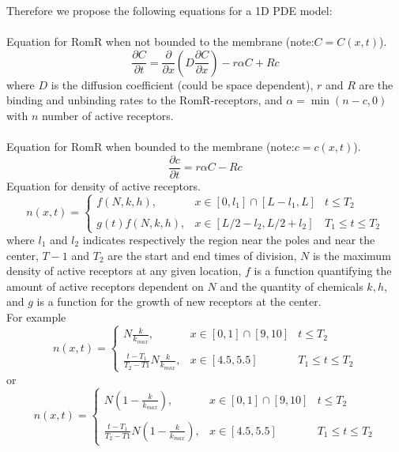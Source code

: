 \documentclass[12pt]{article}
\begin{document}
Therefore we propose the following equations for a 1D PDE model:\\ \\
Equation for RomR when not bounded to the membrane (note:$C=C(x,t)$).
\begin{equation}
\frac{\partial C}{\partial t}=\frac{\partial}{\partial x}\left(D\frac{\partial C}{\partial x}\right)- r\alpha C+R c
\end{equation}
where $D$ is the diffusion coefficient (could be space dependent), $r$ and $R$ are the binding  and unbinding rates to the RomR-receptors, and $\alpha=\min(n-c,0)$ with $n$ number of active receptors.\\ \\
Equation for RomR when bounded to the membrane (note:$c=c(x,t)$).
\begin{equation}
\frac{\partial c}{\partial t}=r\alpha C-R c 
\end{equation}
Equation for density of active receptors.
\begin{equation}
   n(x,t) = \left\{
     \begin{array}{lcr}
       f (N, k, h),& x\in [0, l_1]\cap [L-l_1, L] & t \leq T_2\\
       & &\\
 g(t)f (N, k, h) ,& x \in[L/2-l_2, L/2 +l_2 ] & T_1\leq t \leq T_2

     \end{array}
   \right.
\end{equation}
where $l_1$ and $l_2$ indicates respectively the region near the poles and near the center, $T-1$ and $T_2$ are the start and end times of division,  $N$ is the maximum density of active receptors at any given location, $f$ is a function quantifying the amount of active receptors dependent on $N$ and the quantity of chemicals $k, h$, and $g$ is a function for the growth of new receptors at the center.\\
For example
\begin{equation}
   n(x,t) = \left\{
     \begin{array}{lcr}
       N \frac{k}{k_{max}},& x\in [0, 1]\cap [9, 10] & t \leq T_2\\
       & &\\
 \frac{t-T_1}{T_2-T1}N \frac{k}{k_{max}} ,& x \in[4.5, 5.5] & T_1\leq t \leq T_2

     \end{array}
   \right.
\end{equation}
or
\begin{equation}
   n(x,t) = \left\{
     \begin{array}{lcr}
       N \left(1-\frac{k}{k_{max}}\right),& x\in [0, 1]\cap [9, 10] & t \leq T_2\\
       & &\\
 \frac{t-T_1}{T_2-T1}N \left(1-\frac{k}{k_{max}}\right) ,& x \in[4.5, 5.5] & T_1\leq t \leq T_2

     \end{array}
   \right.
\end{equation}
\end{document}
